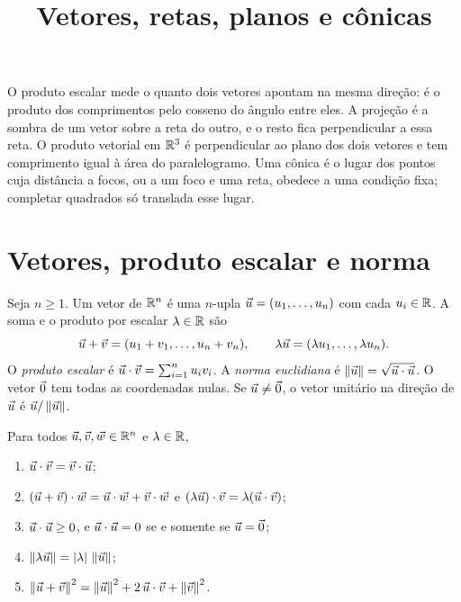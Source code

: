\documentclass[11pt,a4paper]{article}
\title{Vetores, retas, planos e cônicas}
\author{}
\date{}
\begin{document}
\maketitle
\tableofcontents


\begin{intuicao}
O produto escalar mede o quanto dois vetores apontam na mesma direção: é o produto dos comprimentos pelo cosseno do ângulo entre eles. A projeção é a sombra de um vetor sobre a reta do outro, e o resto fica perpendicular a essa reta. O produto vetorial em $\mathbb{R}^3$ é perpendicular ao plano dos dois vetores e tem comprimento igual à área do paralelogramo. Uma cônica é o lugar dos pontos cuja distância a focos, ou a um foco e uma reta, obedece a uma condição fixa; completar quadrados só translada esse lugar.
\end{intuicao}

\section{Vetores, produto escalar e norma}

\begin{definicao}
Seja $n\ge 1$. Um vetor de $\mathbb{R}^n$ é uma $n$-upla $\vec{u}=(u_1,\ldots,u_n)$ com cada $u_i\in\mathbb{R}$. A soma e o produto por escalar $\lambda\in\mathbb{R}$ são
\[
\vec{u}+\vec{v}=(u_1+v_1,\ldots,u_n+v_n),\qquad
\lambda\vec{u}=(\lambda u_1,\ldots,\lambda u_n).
\]
O \emph{produto escalar} é $\vec{u}\cdot\vec{v}=\sum_{i=1}^n u_i v_i$. A \emph{norma euclidiana} é $\left\lVert \vec{u} \right\rVert=\sqrt{\vec{u}\cdot\vec{u}}$. O vetor $\vec{0}$ tem todas as coordenadas nulas. Se $\vec{u}\neq\vec{0}$, o vetor unitário na direção de $\vec{u}$ é $\vec{u}/\left\lVert \vec{u} \right\rVert$.
\end{definicao}

\begin{proposicao}\label{prop:bilinear}
Para todos $\vec{u},\vec{v},\vec{w}\in\mathbb{R}^n$ e $\lambda\in\mathbb{R}$,
\begin{enumerate}
\item $\vec{u}\cdot\vec{v}=\vec{v}\cdot\vec{u}$;
\item $(\vec{u}+\vec{v})\cdot\vec{w}=\vec{u}\cdot\vec{w}+\vec{v}\cdot\vec{w}$ e $(\lambda\vec{u})\cdot\vec{v}=\lambda(\vec{u}\cdot\vec{v})$;
\item $\vec{u}\cdot\vec{u}\ge 0$, e $\vec{u}\cdot\vec{u}=0$ se e somente se $\vec{u}=\vec{0}$;
\item $\left\lVert \lambda\vec{u} \right\rVert=\left\lvert \lambda \right\rvert\,\left\lVert \vec{u} \right\rVert$;
\item $\left\lVert \vec{u}+\vec{v} \right\rVert^2=\left\lVert \vec{u} \right\rVert^2+2\,\vec{u}\cdot\vec{v}+\left\lVert \vec{v} \right\rVert^2$.
\end{enumerate}
\end{proposicao}
\end{document}
